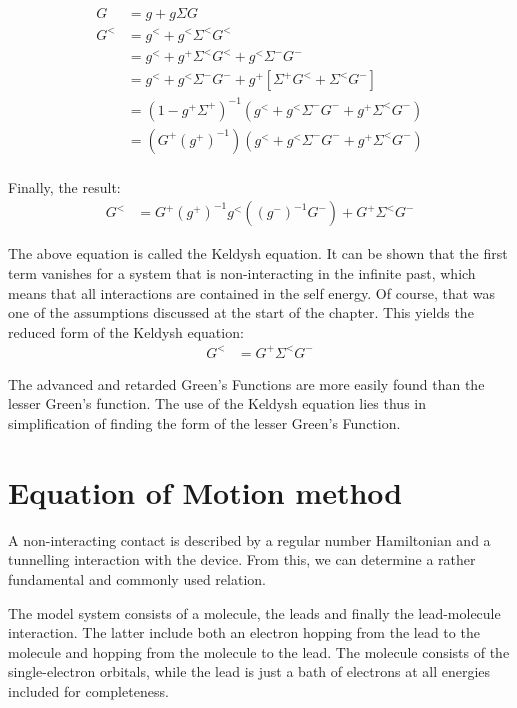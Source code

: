 \begin{align*}
G &= g + g\Sigma G \\
G^< &= g^<  + g^< \Sigma^< G^< \\
 &= g^<  + g^+ \Sigma^< G^< + g^< \Sigma^- G^- \\
 &= g^<  + g^< \Sigma^- G^- + g^+ \left[ \Sigma^+ G^< + \Sigma^< G^- \right]\\
 &= (1 - g^+ \Sigma^+)^{-1} \left( g^<  + g^< \Sigma^- G^- + g^+ \Sigma^< G^-\right) \\
 &= \left(G^+ (g^+)^{-1}\right)\left( g^<  + g^< \Sigma^- G^- + g^+ \Sigma^< G^-\right) \\ 
\end{align*}

Finally, the result:
\begin{align}
G^< &= G^+ (g^+)^{-1} g^< \left((g^-)^{-1}G^-  \right) + G^+  \Sigma^< G^- \label{eq:keldysh}
\end{align}

The above equation is called the Keldysh equation. It can be shown that the first term vanishes for a system that is non\hyp{}interacting in the infinite past, which means that all interactions are contained in the self energy. Of course, that was one of the assumptions discussed at the start of the chapter. This yields the reduced form of the Keldysh equation:
\begin{align*}
G^< &=  G^+ \Sigma^< G^- 
\end{align*}

The advanced and retarded Green's Functions are more easily found than the lesser Green's function. The use of the Keldysh equation lies thus in simplification of finding the form of the lesser Green's Function.

\section{Equation of Motion method}
\label{sec:eommethod}
A non\hyp{}interacting contact is described by a regular number Hamiltonian and a tunnelling interaction with the device. From this, we can determine a rather fundamental and commonly used relation. 

The model system consists of a molecule, the leads and finally the lead-molecule interaction. The latter include both an electron hopping from the lead to the molecule and hopping from the molecule to the lead. The molecule consists of the single-electron orbitals, while the lead is just a bath of electrons at all energies included for completeness.


